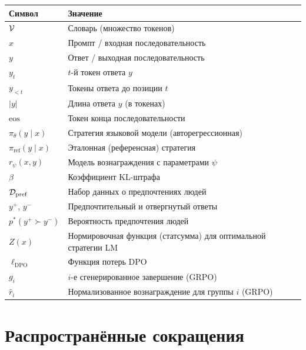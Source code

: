 \begin{center}
\begin{tabular}{@{}ll@{}}
\toprule
\textbf{Символ} & \textbf{Значение} \\
\midrule
$\mathcal{V}$                    & Словарь (множество токенов) \\
$x$                      & Промпт / входная последовательность \\
$y$                      & Ответ / выходная последовательность \\
$y_t$                    & $t$-й токен ответа $y$ \\
$y_{<t}$                 & Токены ответа до позиции $t$ \\
$|y|$                    & Длина ответа $y$ (в токенах) \\
$\mathrm{eos}$           & Токен конца последовательности \\
$\pi_\theta(y\mid x)$    & Стратегия языковой модели (авторегрессионная) \\
$\pi_\mathrm{ref}(y\mid x)$ & Эталонная (референсная) стратегия \\
$r_\psi(x,y)$            & Модель вознаграждения с параметрами $\psi$ \\
$\beta$                  & Коэффициент KL-штрафа \\
$\mathcal{D}_\mathrm{pref}$      & Набор данных о предпочтениях людей \\
$y^+$, $y^-$             & Предпочтительный и отвергнутый ответы \\
$p^*(y^+\succ y^-)$      & Вероятность предпочтения людей \\
$Z(x)$                   & Нормировочная функция (статсумма) для оптимальной стратегии LM \\
$\ell_\mathrm{DPO}$      & Функция потерь DPO \\
$g_i$                    & $i$-е сгенерированное завершение (GRPO) \\
$\hat{r}_i$              & Нормализованное вознаграждение для группы $i$ (GRPO) \\
\bottomrule
\end{tabular}
\end{center}

\newpage
\section*{Распространённые сокращения}


